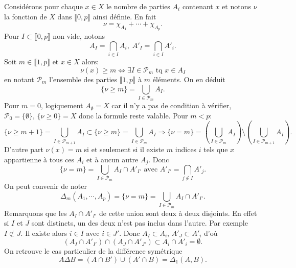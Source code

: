 \noindent Considérons pour chaque $x\in X$ le nombre de parties $A_i$ contenant $x$ et notons $\nu$ la fonction de $X$ dans $\llbracket 0, p \rrbracket$ ainsi définie. En fait 
\begin{displaymath}
  \nu = \chi_{A_1} + \cdots + \chi_{A_p}.
\end{displaymath}
Pour $I \subset \llbracket 0,p \rrbracket$ non vide, notons
\begin{displaymath}
  A_I = \bigcap_{i \in I} A_i, \; A'_I = \bigcap_{i \in I} A'_i.
\end{displaymath}
Soit $m \in \llbracket 1,p\rrbracket$ et $x \in X$ alors:
\begin{displaymath}
  \nu(x) \geq m \Leftrightarrow \exists I \in \mathcal{P}_m \text{ tq } x \in A_I
\end{displaymath}
en notant $\mathcal{P}_m$ l'ensemble des parties $\llbracket 1,p \rrbracket$ à $m$ éléments. On en déduit 
\begin{displaymath}
  \{ \nu \geq m \} = \bigcup_{I \in \mathcal{P}_m}A_I.
\end{displaymath}
Pour $m=0$, logiquement $A_\emptyset = X$ car il n'y a pas de condition à vérifier, $\mathcal{P}_0 = \{\emptyset\}$, $\{ \nu \geq 0 \} = X$ donc la formule reste valable.
Pour $m < p $:
\begin{displaymath}
  \{ \nu \geq m + 1 \} = \bigcup_{I \in \mathcal{P}_{m+1}}A_I \subset \{ \nu \geq m \} = \bigcup_{I \in \mathcal{P}_{m}}A_I
  \Rightarrow
  \{ \nu = m \} = \left( \bigcup_{I \in \mathcal{P}_{m}}A_I\right) \setminus \left( \bigcup_{I \in \mathcal{P}_{m+1}}A_I\right).
\end{displaymath}
D'autre part $\nu(x) = m$ si et seulement si il existe $m$ indices $i$ tels que $x$ appartienne à tous ces $A_i$ et à aucun autre $A_j$. Donc
\begin{displaymath}
  \{\nu = m\} = \bigcup_{I \in \mathcal{P}_{m}}A_I \cap A'_{I'} \text{ avec } A'_{I'} = \bigcap_{j\notin I}A'_j.
\end{displaymath}
On peut convenir de noter 
\begin{displaymath}
\Delta_m(A_1,\cdots,A_p) = \{\nu = m\} = \bigcup_{I \in \mathcal{P}_{m}}A_I \cap A'_{I'}.  
\end{displaymath}
Remarquons que les $A_I \cap A'_{I'}$ de cette union sont deux à deux disjoints. En effet si $I$ et $J$ sont distincts, un des deux n'est pas inclus dans l'autre. Par exemple $I \not \subset J$. Il existe alors $i\in I$ avec $i \in J'$. Donc $A_I \subset A_i$, $A'_J \subset A'_i$ d'où 
\begin{displaymath}
  \left( A_I \cap A'_{I'} \right) \cap \left( A_J \cap A'_{J'} \right) \subset A_i \cap A'_i = \emptyset.
\end{displaymath}
On retrouve le cas particulier de la différence symétrique
\begin{displaymath}
  A \Delta B = (A\cap B') \cup (A' \cap B) = \Delta_1(A,B). 
\end{displaymath}


